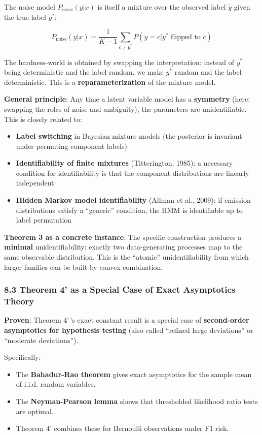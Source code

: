 \documentclass[
  12pt,
]{ctexart}
\providecommand{\tightlist}{%
  \setlength{\itemsep}{0pt}\setlength{\parskip}{0pt}}
\begin{document}
The noise model \(P_{\text{noise}}(y | x)\) is itself a mixture over the
observed label \(\tilde{y}\) given the true label \(y^*\):

\[P_{\text{noise}}(y | x) = \frac{1}{K-1}\sum_{c \neq y^*} P(y = c | y^* \text{ flipped to } c)\]

The hardness-world is obtained by swapping the interpretation: instead
of \(y^*\) being deterministic and the label random, we make \(y^*\)
random and the label deterministic. This is a
\textbf{reparameterization} of the mixture model.

\textbf{General principle}: Any time a latent variable model has a
\textbf{symmetry} (here: swapping the roles of noise and ambiguity), the
parameters are unidentifiable. This is closely related to:

\begin{itemize}
\tightlist
\item
  \textbf{Label switching} in Bayesian mixture models (the posterior is
  invariant under permuting component labels)
\item
  \textbf{Identifiability of finite mixtures} (Titterington, 1985): a
  necessary condition for identifiability is that the component
  distributions are linearly independent
\item
  \textbf{Hidden Markov model identifiability} (Allman et al., 2009): if
  emission distributions satisfy a ``generic'' condition, the HMM is
  identifiable up to label permutation
\end{itemize}

\textbf{Theorem 3 as a concrete instance}: The specific construction
produces a \textbf{minimal} unidentifiability: exactly two
data-generating processes map to the same observable distribution. This
is the ``atomic'' unidentifiability from which larger families can be
built by convex combination.

\subsubsection{8.3 Theorem 4' as a Special Case of Exact Asymptotics
Theory}\label{theorem-4-as-a-special-case-of-exact-asymptotics-theory}

\textbf{Proven}: Theorem 4'\,'s exact constant result is a special case
of \textbf{second-order asymptotics for hypothesis testing} (also called
``refined large deviations'' or ``moderate deviations'').

Specifically:

\begin{itemize}
\tightlist
\item
  The \textbf{Bahadur-Rao theorem} gives exact asymptotics for the
  sample mean of i.i.d. random variables.
\item
  The \textbf{Neyman-Pearson lemma} shows that thresholded likelihood
  ratio tests are optimal.
\item
  Theorem 4' combines these for Bernoulli observations under F1 risk.
\end{itemize}
\end{document}
